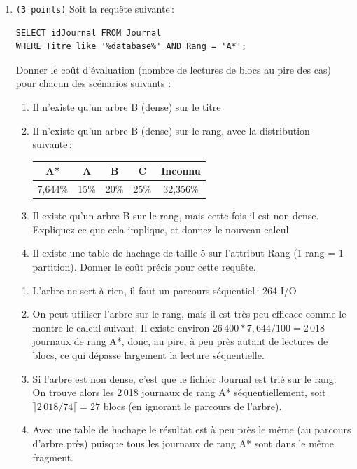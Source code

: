 \begin{enumerate}
	\item {\tt (3~points)} Soit la requête suivante\,:
\begin{verbatim}
SELECT idJournal FROM Journal 
WHERE Titre like '%database%' AND Rang = 'A*';
\end{verbatim}
	Donner le coût d'évaluation (nombre de lectures de blocs au pire des cas)
   pour chacun des scénarios  suivants :
	\begin{enumerate}
		\item Il n'existe qu'un arbre  B (dense) sur le titre
		\item  Il n'existe qu'un arbre  B (dense) sur le rang, avec la distribution suivante\,:\\
		\begin{tabular}{|c|c|c|c|c|}
			\hline
			A*& A& B& C& Inconnu\\
			\hline
			7,644\%& 15\% & 20\% & 25\% & 32,356\%\\
			\hline
		\end{tabular}
    \item Il existe qu'un arbre  B sur le rang, mais cette fois il est non dense.
     Expliquez ce que cela implique, et donnez le nouveau calcul.
		\item Il existe une table de hachage de taille 5 sur
    l'attribut Rang (1 rang = 1 partition). Donner le coût précis pour cette requête.
	\end{enumerate}
	\begin{solution}
		\begin{enumerate}
			\item L'arbre  ne sert à rien, il faut un parcours séquentiel\,: 264 I/O
			\item On peut utiliser l'arbre  sur le rang, mais il est très peu
      efficace comme le montre le calcul suivant.
      Il existe environ $26\, 400*7,644/100 = 2\,018$ journaux de rang A*,
      donc, au pire, à peu près autant de lectures de blocs, ce qui
	  dépasse largement la lecture séquentielle.

      \item Si l'arbre est non dense, c'est que 
	  le fichier Journal est trié sur le rang.
	  On trouve alors les 2\,018 journaux de rang A*
         séquentiellement, soit $\rceil 2\,018 / 74 \lceil = 27$ blocs
		 (en ignorant le parcours de l'arbre).
			\item Avec une table de hachage le résultat est à peu
         près le même (au parcours d'arbre près)
         puisque tous les journaux de rang A* sont dans le même fragment.
		\end{enumerate}
	\end{solution}


\end{enumerate}
